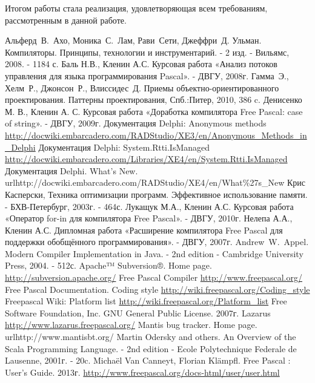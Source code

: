 \documentclass{imcs}
\begin{document}
Итогом работы стала реализация, удовлетворяющая всем требованиям, рассмотренным в данной работе.

\pagebreak

\begin{thebibliography}{99}
 Альферд~В.~Ахо, Моника~С.~Лам, Рави~Сети, Джеффри~Д. Ульман. Компиляторы. Принципы, технологии и инструментарий. - 2 изд. - Вильямс, 2008. - 1184 с.
 Баль Н.В., Кленин А.С. Курсовая работа «Анализ потоков управления для языка программирования Pascal». - ДВГУ, 2008г.
 Гамма~Э., Хелм~Р., Джонсон~Р., Влиссидес~Д. Приемы объектно-ориентированного проектирования. Паттерны проектирования, Спб.:Питер, 2010, 386 c.
 Денисенко М. В., Кленин А. С. Курсовая работа «Доработка компилятора Free Pascal: case of string». - ДВГУ, 2009г.
 Документация Delphi: Anonymous methods \url{http://docwiki.embarcadero.com/RADStudio/XE3/en/Anonymous_Methods_in_Delphi}
 Документация Delphi: System.Rtti.IsManaged \url{http://docwiki.embarcadero.com/Libraries/XE4/en/System.Rtti.IsManaged}
 Документация Delphi. What's New. url{http://docwiki.embarcadero.com/RADStudio/XE4/en/What\%27s\_New}
 Крис Касперски, Техника оптимизации программ. Эффективное использование памяти. - БХВ-Петербург, 2003г. - 464с.
 Лукащук М.А., Кленин А.С. Курсовая работа «Оператор for-in для компилятора Free Pascal». - ДВГУ, 2010г.
 Нелепа А.А., Кленин А.С. Дипломная работа «Расширение компилятора Free Pascal для поддержки обобщённого программирования». - ДВГУ, 2007г.
 Andrew~W.~Appel. Modern Compiler Implementation in Java. - 2nd edition - Cambridge University Press, 2004. - 512с.
 Apache™ Subversion®. Home page. \url{http://subversion.apache.org/}
 Free Pascal Compiler \url{http://www.freepascal.org/}
 Free Pascal Documentation. Coding style \url{http://wiki.freepascal.org/Coding_style}
 Freepascal Wiki: Platform list \url{http://wiki.freepascal.org/Platform_list}
 Free Software Foundation, Inc. GNU General Public License. 2007г.
 Lazarus \url{http://www.lazarus.freepascal.org/}
 Mantis bug tracker. Home page. url{http://www.mantisbt.org/}
 Martin Odersky and others. An Overview of the Scala Programming Language. - 2nd edition - Ecole Polytechnique Federale de Lausenne, 2001г. - 20c.
 Michaël Van Canneyt, Florian Klämpfl. Free Pascal : User’s Guide. 2013г. \url{http://www.freepascal.org/docs-html/user/user.html}

\end{thebibliography}
\end{document}
